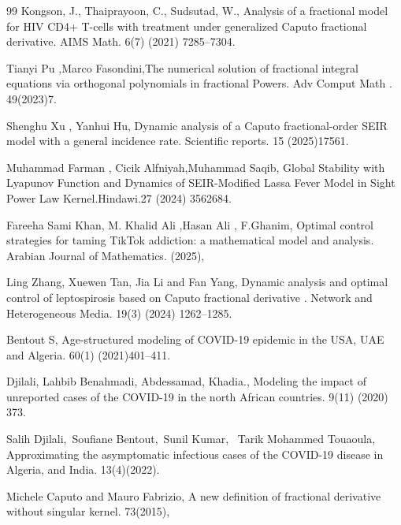 \documentclass[10pt]{NSP1}
\begin{document}
\begin{thebibliography}{99}
Kongson, J., Thaiprayoon, C., Sudsutad, W., Analysis of a fractional model for HIV CD4+ T-cells with treatment under generalized Caputo fractional derivative. AIMS Math. 6(7) (2021) 7285–7304.

Tianyi Pu ,Marco Fasondini,The numerical solution of fractional integral equations via orthogonal polynomials in fractional Powers. Adv Comput Math . 49(2023)7.

Shenghu Xu , Yanhui Hu, Dynamic analysis of a Caputo fractional-order SEIR model with a general incidence rate. Scientific reports. 15 (2025)17561.

Muhammad Farman , Cicik Alfniyah,Muhammad Saqib, Global Stability with Lyapunov Function and Dynamics of SEIR-Modified Lassa Fever Model in Sight Power Law Kernel.Hindawi.27 (2024) 3562684.

Fareeha Sami Khan, M. Khalid Ali ,Hasan Ali , F.Ghanim, Optimal control strategies for taming TikTok addiction: a mathematical model and analysis. Arabian Journal of Mathematics. (2025),

Ling Zhang, Xuewen Tan, Jia Li and Fan Yang, Dynamic analysis and optimal control of leptospirosis based on Caputo fractional derivative . Network and Heterogeneous Media. 19(3) (2024) 1262–1285.

Bentout S, Age-structured modeling of COVID-19 epidemic in the USA, UAE and Algeria. 60(1) (2021)401–411.

Djilali, Lahbib Benahmadi, Abdessamad, Khadia., Modeling the impact of unreported cases of the COVID-19 in the north African countries. 9(11) (2020) 373.

Salih Djilali, Soufiane Bentout, Sunil Kumar,  Tarik Mohammed Touaoula, Approximating the asymptomatic infectious cases of the COVID-19 disease in Algeria, and India. 13(4)(2022).

Michele Caputo and Mauro Fabrizio, A new deﬁnition of fractional derivative without singular kernel. 73(2015),

\end{thebibliography}
\end{document}
